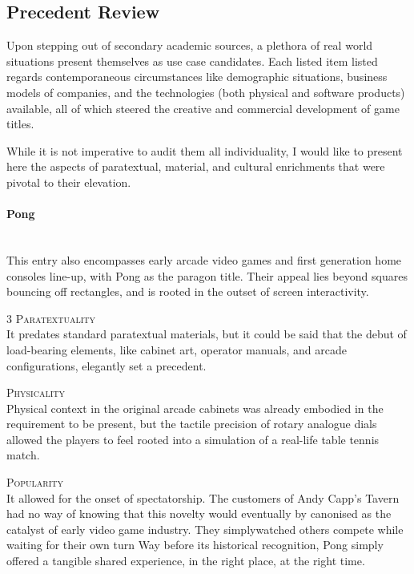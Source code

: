 \documentclass[12pt]{article}
\begin{document}
\subsection{Precedent Review}\label{sec22}
Upon stepping out of secondary academic sources, a plethora of real world situations present themselves as use case candidates.
Each listed item listed regards contemporaneous circumstances like demographic situations, business models of companies, and the technologies (both physical and software products) available, all of which steered the creative and commercial development of game titles.

While it is not imperative to audit them all individuality, I would like to present here the aspects of paratextual, material, and cultural enrichments that were pivotal to their elevation.
    
\paragraph{Pong}\phantom{.}\\
    This entry also encompasses early arcade video games and first generation home consoles line-up, with Pong \parencite{pong1972} as the paragon title.
    Their appeal lies beyond squares bouncing off rectangles, and is rooted in the outset of screen interactivity.
\begin{multicols}{3}
    \textsc{Paratextuality}\phantom{.}\\
    It predates standard paratextual materials, but it could be said that the debut of load-bearing elements, like cabinet art, operator manuals, and arcade configurations, elegantly set a precedent.
    \columnbreak\par\textsc{Physicality}\phantom{.}\\
    Physical context in the original arcade cabinets was already embodied in the requirement to be present, but the tactile precision of rotary analogue dials allowed the players to feel rooted into a simulation of a real-life table tennis match.
    \columnbreak\par\textsc{Popularity}\\
    It allowed for the onset of spectatorship. The customers of Andy Capp's Tavern had no way of knowing that this novelty would eventually by canonised as the catalyst of early video game industry. They simplywatched others compete while waiting for their own turn Way before its historical recognition, Pong simply offered a tangible shared experience, in the right place, at the right time.
\end{multicols}
\end{document}
